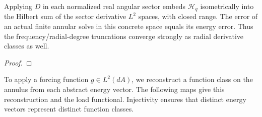 \begin{supporting}
\begin{theorem}
\label{thm:annular-angular-derivatives}
\leanok
Applying $D$ in each normalized real angular sector embeds $\mathcal H_q$
isometrically into the Hilbert sum of the sector derivative $L^2$ spaces, with
closed range. The error of an actual finite annular solve in this concrete space
equals its energy error. Thus the frequency/radial-degree truncations converge
strongly as radial derivative classes as well.
\end{theorem}
\begin{proof}
\leanok
\end{proof}

To apply a forcing function $g\in L^2(dA)$, we reconstruct a function class
on the annulus from each abstract energy vector. The following maps give this
reconstruction and the load functional. Injectivity ensures that distinct
energy vectors represent distinct function classes.


\end{supporting}
